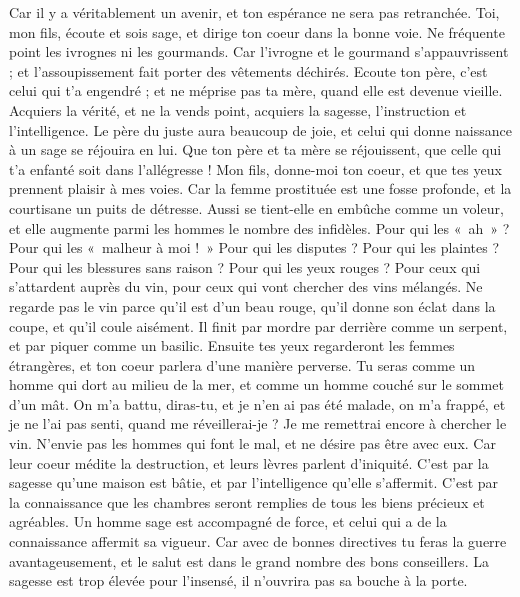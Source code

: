 \begin{multicols}{2}
Car il y a véritablement un avenir, et ton espérance ne sera pas retranchée.
Toi, mon fils, écoute et sois sage, et dirige ton coeur dans la bonne voie.
Ne fréquente point les ivrognes ni les gourmands.
Car l'ivrogne et le gourmand s’appauvrissent ; et l’assoupissement fait porter des vêtements déchirés.
Ecoute ton père, c’est celui qui t'a engendré ; et ne méprise pas ta mère, quand elle est devenue vieille.
Acquiers la vérité, et ne la vends point, acquiers la sagesse, l'instruction et l’intelligence.
Le père du juste aura beaucoup de joie, et celui qui donne naissance à un sage se réjouira en lui.
Que ton père et ta mère se réjouissent, que celle qui t'a enfanté soit dans l’allégresse !
Mon fils, donne-moi ton coeur, et que tes yeux prennent plaisir à mes voies.
Car la femme prostituée est une fosse profonde, et la courtisane un puits de détresse.
Aussi se tient-elle en embûche comme un voleur, et elle augmente parmi les hommes le nombre des infidèles.
Pour qui les «~ah~» ? Pour qui les «~malheur à moi !~» Pour qui les disputes ? Pour qui les plaintes ? Pour qui les blessures sans raison ? Pour qui les yeux rouges ?
Pour ceux qui s'attardent auprès du vin, pour ceux qui vont chercher des vins mélangés.
Ne regarde pas le vin parce qu’il est d’un beau rouge, qu’il donne son éclat dans la coupe, et qu'il coule aisément.
Il finit par mordre par derrière comme un serpent, et par piquer comme un basilic.
Ensuite tes yeux regarderont les femmes étrangères, et ton coeur parlera d’une manière perverse.
Tu seras comme un homme qui dort au milieu de la mer, et comme un homme couché sur le sommet d’un mât.
On m'a battu, diras-tu, et je n'en ai pas été malade, on m'a frappé, et je ne l'ai pas senti, quand me réveillerai-je ? Je me remettrai encore à chercher le vin.
\VerseOne{}N'envie pas les hommes qui font le mal, et ne désire pas être avec eux.
Car leur coeur médite la destruction, et leurs lèvres parlent d’iniquité.
C’est par la sagesse qu’une maison est bâtie, et par l'intelligence qu’elle s’affermit.
C’est par la connaissance que les chambres seront remplies de tous les biens précieux et agréables.
Un homme sage est accompagné de force, et celui qui a de la connaissance affermit sa vigueur.
Car avec de bonnes directives tu feras la guerre avantageusement, et le salut est dans le grand nombre des bons conseillers.
La sagesse est trop élevée pour l'insensé, il n'ouvrira pas sa bouche à la porte.

\end{multicols}
